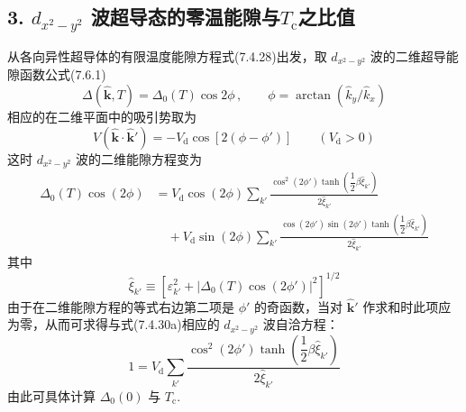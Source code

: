 \subsection*{3. $d_{x^{2}-y^{2}}$ 波超导态的零温能隙与$T_{\mathrm{c}}$之比值}

从各向异性超导体的有限温度能隙方程式(7.4.28)出发，取 $d_{x^{2}-y^{2}}$ 波的二维超导能隙函数公式(7.6.1)
\begin{equation*}
  \Delta\left(\hat{\boldsymbol{k}},T\right)=\Delta_{0}(T)\cos2\phi\,,\qquad
  \phi=\arctan\left(\hat{k}_{y}/\hat{k}_{x}\right)
\end{equation*}
相应的在二维平面中的吸引势取为
\begin{equation}
  V\left(\hat{\boldsymbol{k}}\cdot\hat{\boldsymbol{k}}'\right)=-V_{\mathrm{d}}\cos\left[2\left(\phi-\phi'\right)\right]
  \qquad\left(V_{\mathrm{d}}>0\right)
\end{equation}
这时 $d_{x^{2}-y^{2}}$ 波的二维能隙方程变为
\begin{equation*}
\begin{aligned}
  \Delta_{0}(T)\cos(2\phi)
  &=V_{\mathrm{d}}\cos(2\phi)\sum_{k'}
  \frac{\cos^{2}(2\phi')\tanh\left(\dfrac{1}{2}\beta\hat{\xi}_{k'}\right)}{2\hat{\xi}_{k'}}\\
  &\quad+V_{\mathrm{d}}\sin(2\phi)\sum_{k'}
  \frac{\cos(2\phi')\sin(2\phi')\tanh\left(\dfrac{1}{2}\beta\hat{\xi}_{k'}\right)}{2\hat{\xi}_{k'}}
\end{aligned}
\end{equation*}
其中
\begin{equation}
  \hat{\xi}_{k'}\equiv\left[\varepsilon_{k'}^{2}+\left|\Delta_{0}(T)\cos(2\phi')\right|^{2}\right]^{1/2}
\end{equation}
由于在二维能隙方程的等式右边第二项是 $\phi'$ 的奇函数，当对 $\hat{\boldsymbol{k}}'$ 作求和时此项应为零，从而可求得与式(7.4.30a)相应的 $d_{x^{2}-y^{2}}$ 波自洽方程：
\begin{equation}
  1=V_{\mathrm{d}}\sum_{k'}\frac{\cos^{2}(2\phi')\tanh\left(\dfrac{1}{2}\beta\hat{\xi}_{k'}\right)}{2\hat{\xi}_{k'}}
\end{equation}
由此可具体计算 $\Delta_{0}(0)$ 与 $T_{\mathrm{c}}$.

